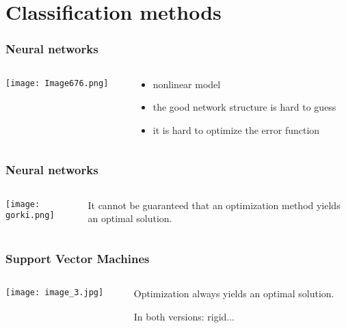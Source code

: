 \documentclass{beamer}
\begin{document}
\section{Classification methods}
\begin{frame} \frametitle{Neural networks}
\begin{columns}
\begin{column}{5cm}
 \texttt{[image: Image676.png]}
\end{column}
 \begin{column}{5cm}
\begin{itemize}
 \item nonlinear model
 \pause \item the good network structure is hard to guess
 \pause \item it is hard to optimize the error function 
\end{itemize}  
 \end{column}

\end{columns}

\end{frame}

\begin{frame} \frametitle{Neural networks}
\begin{columns}
\begin{column}{5cm}
\texttt{[image: gorki.png]}
\end{column}
\begin{column}{5cm}
It cannot be guaranteed that an optimization method yields an optimal solution.
\end{column}
\end{columns}
\end{frame}

\begin{frame} \frametitle{Support Vector Machines}
\begin{columns}
\begin{column}{5cm}
\texttt{[image: image\_3.jpg]}
\end{column}
\begin{column}{5cm}
Optimization always yields an optimal solution.

In both versions: rigid...
\end{column} 
\end{columns}
\end{frame}
\end{document}
